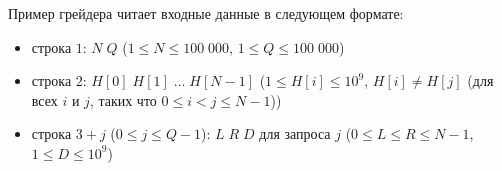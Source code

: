 

Пример грейдера читает входные данные в следующем формате:
\begin{itemize}
    \item  строка $1$: $N \; Q$ ($1 \le N \le 100\;000$, $1 \le Q \le 100\;000$)
    \item строка $2$: $H[0] \; H[1] \; \ldots \; H[N - 1]$ ($1 \le H[i] \le 10^9$, $H[i] \ne H[j]$ (для всех $i$ и $j$, таких что $0 \le i \lt j \le N - 1$))
    \item строка $3 + j$ ($0 \le j \le Q - 1$): $L \; R \; D$ для запроса $j$ ($0 \le L \le R \le N - 1$, $1 \le D \le 10^9$)
\end{itemize}